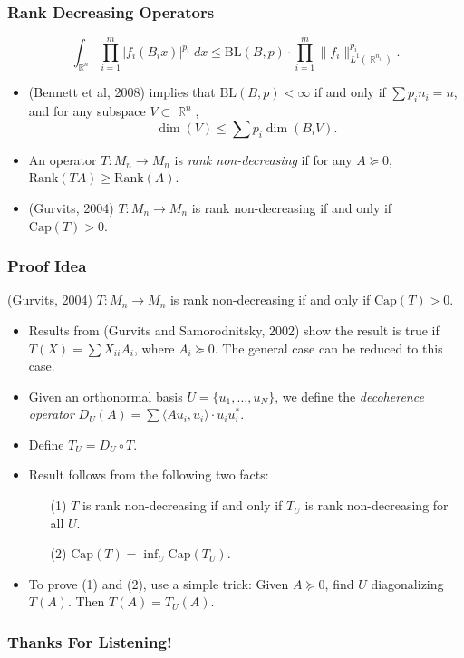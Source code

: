 \documentclass[usenames,dvipsnames,12pt]{beamer}
\DeclareMathOperator{\RR}{\mathbb{R}}
\begin{document}
\begin{frame}
    \frametitle{Rank Decreasing Operators}

    \[ \int_{\RR^n} \prod_{i = 1}^m |f_i(B_i x)|^{p_i}\; dx \leq \text{BL}(B,p) \cdot \prod_{i=1}^m \| f_i \|_{L^1(\RR^{n_i})}^{p_i}.  \]

    \begin{itemize}
        \pause
        \item (Bennett et al, 2008) implies that $\text{BL}(B,p) < \infty$ if and only if $\sum p_i n_i = n$, and for any subspace $V \subset \RR^n$,
        \[ \dim(V) \leq \sum p_i \dim(B_i V). \]

        \pause
        \item An operator $T: M_n \to M_n$ is \emph{rank non-decreasing} if for any $A \succeq 0$, $\text{Rank}(TA) \geq \text{Rank}(A)$.

        \pause
        \item (Gurvits, 2004) $T: M_n \to M_n$ is rank non-decreasing if and only if $\text{Cap}(T) > 0$.
    \end{itemize}
\end{frame}


\begin{frame}
    \frametitle{Proof Idea}

    (Gurvits, 2004) $T: M_n \to M_n$ is rank non-decreasing if and only if $\text{Cap}(T) > 0$.

    \begin{itemize}
        \pause
        \item Results from (Gurvits and Samorodnitsky, 2002) show the result is true if $T(X) = \sum X_{ii} A_i$, where $A_i \succeq 0$. The general case can be reduced to this case.

        \pause
        \item Given an orthonormal basis $U = \{ u_1, \dots, u_N \}$, we define the \emph{decoherence operator} $D_U(A) = \sum \langle Au_i, u_i \rangle \cdot u_i u_i^*$.

        \pause
        \item Define $T_U = D_U \circ T$.

        \pause
        \item Result follows from the following two facts:
        \begin{itemize}
            \pause
            \item[(1)] $T$ is rank non-decreasing if and only if $T_U$ is rank non-decreasing for all $U$.
            
            \pause
            \item[(2)] $\text{Cap}(T) = \inf_U \text{Cap}(T_U)$.
        \end{itemize}

        \pause
        \item To prove (1) and (2), use a simple trick: Given $A \succeq 0$, find $U$ diagonalizing $T(A)$. Then $T(A) = T_U(A)$.
    \end{itemize}
\end{frame}


\begin{frame}
    \frametitle{Thanks For Listening!}
\end{frame}
\end{document}
